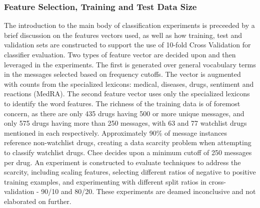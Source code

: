\documentclass[twoside,11pt]{article}
\begin{document}
\subsubsection{Feature Selection, Training and Test Data Size}
The introduction to the main body of classification experiments is preceeded by a brief discussion on the features vectors used, as well as how training, test and validation sets are constructed to support the use of 10-fold Cross Validation for classifier evaluation.
Two types of feature vector are decided upon and then leveraged in the  experiments. The first is generated over general vocabulary terms in the messages selected based on frequency cutoffs. The vector is augmented with counts from the specialized lexicons: medical, diseases, drugs, sentiment and reactions (MedRA). The second feature vector uses only the specialized lexicons to identify the word features.
The richness of the training data is of foremost concern, as there are only 435 drugs having 500 or more unique messages, and only 575 drugs having more than 250 messages, with 63 and 77 watchlist drugs mentioned in each respectively. Approximately 90\% of message instances reference non-watchlist drugs, creating a data scarcity problem when attempting to classify watchlist drugs. Chee decides upon a minimum cutoff of 250 messages per drug. An experiment is constructed to evaluate techniques to address the scarcity, including scaling features, selecting different ratios of negative to positive training examples, and experimenting with different split ratios in cross-validation - 90/10 and 80/20. These experiments are deamed inconclusive and not elaborated on further.
\end{document}
